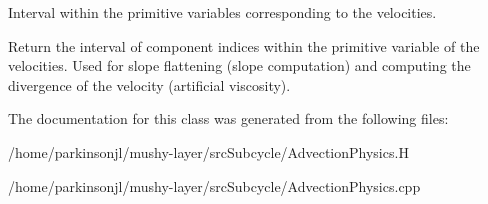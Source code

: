 Interval within the primitive variables corresponding to the velocities. 

Return the interval of component indices within the primitive variable of the velocities. Used for slope flattening (slope computation) and computing the divergence of the velocity (artificial viscosity). 

The documentation for this class was generated from the following files\-:\begin{DoxyCompactItemize}
\item 
/home/parkinsonjl/mushy-\/layer/src\-Subcycle/Advection\-Physics.\-H\item 
/home/parkinsonjl/mushy-\/layer/src\-Subcycle/Advection\-Physics.\-cpp\end{DoxyCompactItemize}
